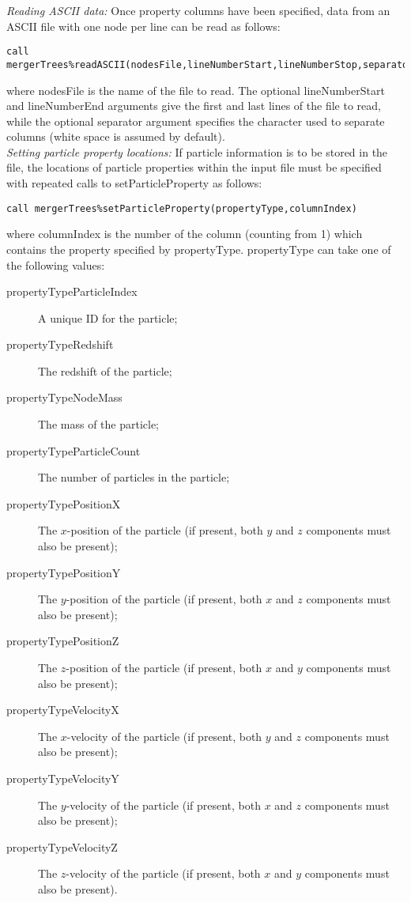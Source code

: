 \noindent \emph{Reading ASCII data:} Once property columns have been specified, data from an ASCII file with one node per line can be read as follows:
\begin{verbatim}
call mergerTrees%readASCII(nodesFile,lineNumberStart,lineNumberStop,separator=",")
\end{verbatim}
where {\normalfont \ttfamily nodesFile} is the name of the file to read. The optional {\normalfont \ttfamily lineNumberStart} and {\normalfont \ttfamily lineNumberEnd} arguments give the first and last lines of the file to read, while the optional {\normalfont \ttfamily separator} argument specifies the character used to separate columns (white space is assumed by default).\\

\noindent \emph{Setting particle property locations:} If particle information is to be stored in the file, the locations of particle properties within the input file must be specified with repeated calls to {\normalfont \ttfamily setParticleProperty} as follows:
\begin{verbatim}
call mergerTrees%setParticleProperty(propertyType,columnIndex)
\end{verbatim}
where {\normalfont \ttfamily columnIndex} is the number of the column (counting from 1) which contains the property specified by {\normalfont \ttfamily propertyType}. {\normalfont \ttfamily propertyType} can take one of the following values:
\begin{description}
 \item [{\normalfont \ttfamily propertyTypeParticleIndex}] A unique ID for the particle;
 \item [{\normalfont \ttfamily propertyTypeRedshift}] The redshift of the particle;
 \item [{\normalfont \ttfamily propertyTypeNodeMass}] The mass of the particle;
 \item [{\normalfont \ttfamily propertyTypeParticleCount}] The number of particles in the particle;
 \item [{\normalfont \ttfamily propertyTypePositionX}] The $x$-position of the particle (if present, both $y$ and $z$ components must also be present);
 \item [{\normalfont \ttfamily propertyTypePositionY}] The $y$-position of the particle (if present, both $x$ and $z$ components must also be present);
 \item [{\normalfont \ttfamily propertyTypePositionZ}] The $z$-position of the particle (if present, both $x$ and $y$ components must also be present);
 \item [{\normalfont \ttfamily propertyTypeVelocityX}] The $x$-velocity of the particle (if present, both $y$ and $z$ components must also be present);
 \item [{\normalfont \ttfamily propertyTypeVelocityY}] The $y$-velocity of the particle (if present, both $x$ and $z$ components must also be present);
 \item [{\normalfont \ttfamily propertyTypeVelocityZ}] The $z$-velocity of the particle (if present, both $x$ and $y$ components must also be present).
\end{description}

